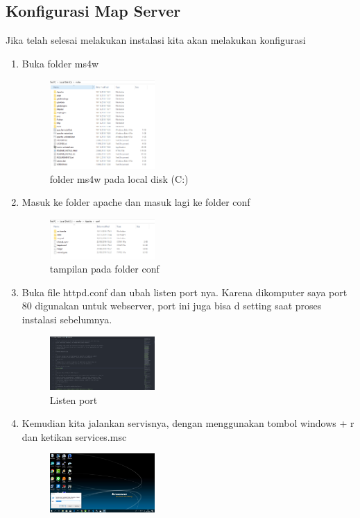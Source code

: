 \subsection{Konfigurasi Map Server}
Jika telah selesai melakukan instalasi kita akan melakukan konfigurasi
\begin{enumerate}
  \item Buka folder ms4w
  \hfill\break
    \begin{figure}[H]
		\includegraphics[width=4cm]{figures/1174096/4/g4.PNG}
		\centering
		\caption{folder ms4w pada local disk (C:)}
    \end{figure}
  \item Masuk ke folder apache dan masuk lagi ke folder conf
  \hfill\break
    \begin{figure}[H]
		\includegraphics[width=4cm]{figures/1174096/4/g5.PNG}
		\centering
		\caption{tampilan pada folder conf}
    \end{figure}
  \item Buka file httpd.conf dan ubah listen port nya. Karena dikomputer saya port 80 digunakan untuk webserver, port ini juga bisa d setting saat proses instalasi sebelumnya.
  \hfill\break
    \begin{figure}[H]
		\includegraphics[width=4cm]{figures/1174096/4/g6.PNG}
		\centering
		\caption{Listen port}
    \end{figure}
  \item Kemudian kita jalankan servisnya, dengan menggunakan tombol windows + r dan ketikan services.msc
  \hfill\break
    \begin{figure}[H]
		\includegraphics[width=4cm]{figures/1174096/4/g7.PNG}

\end{figure}
\end{enumerate}
